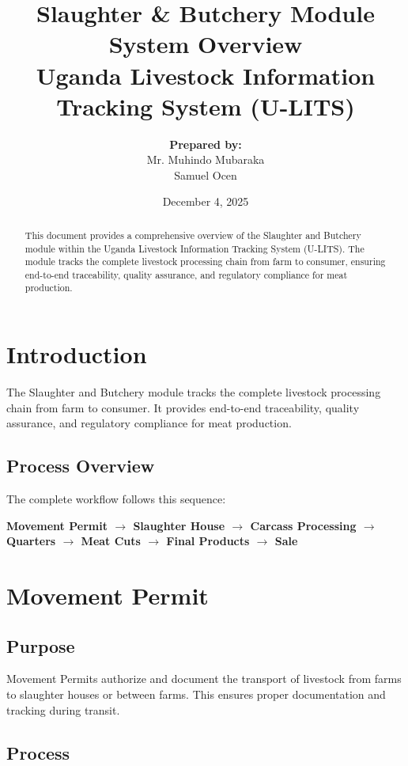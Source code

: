 \documentclass[11pt,a4paper]{article}
\title{
    \vspace{-2cm}
    {\Huge\textbf{Slaughter \& Butchery Module}}\\[0.5cm]
    {\Large System Overview}\\[1cm]
    {\large Uganda Livestock Information Tracking System (U-LITS)}
}
\author{
    \textbf{Prepared by:}\\[0.3cm]
    Mr. Muhindo Mubaraka\\
    Samuel Ocen
}
\date{December 4, 2025}
\begin{document}
\maketitle
\thispagestyle{empty}

\begin{abstract}
This document provides a comprehensive overview of the Slaughter and Butchery module within the Uganda Livestock Information Tracking System (U-LITS). The module tracks the complete livestock processing chain from farm to consumer, ensuring end-to-end traceability, quality assurance, and regulatory compliance for meat production.
\end{abstract}

\newpage
\tableofcontents
\newpage

\section{Introduction}

The Slaughter and Butchery module tracks the complete livestock processing chain from farm to consumer. It provides end-to-end traceability, quality assurance, and regulatory compliance for meat production.

\subsection{Process Overview}

The complete workflow follows this sequence:

\begin{center}
\textbf{Movement Permit $\rightarrow$ Slaughter House $\rightarrow$ Carcass Processing $\rightarrow$ Quarters $\rightarrow$ Meat Cuts $\rightarrow$ Final Products $\rightarrow$ Sale}
\end{center}

\section{Movement Permit}

\subsection{Purpose}

Movement Permits authorize and document the transport of livestock from farms to slaughter houses or between farms. This ensures proper documentation and tracking during transit.

\subsection{Process}
\end{document}
